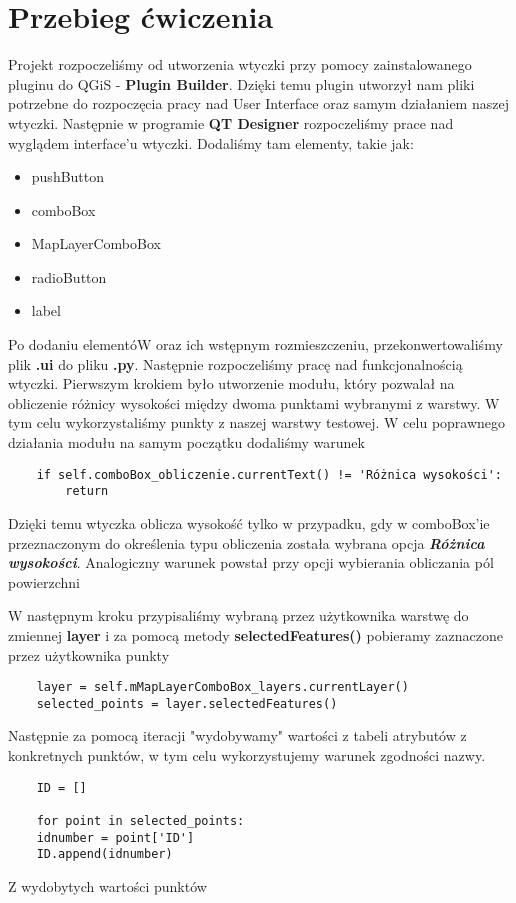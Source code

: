 \documentclass[a4paper,titleauthor]{mwart}
\begin{document}
\section{Przebieg ćwiczenia}
Projekt rozpoczeliśmy od utworzenia wtyczki przy pomocy zainstalowanego pluginu do QGiS - \textbf{Plugin Builder}. Dzięki temu plugin utworzył nam pliki potrzebne do rozpoczęcia pracy nad User Interface oraz samym działaniem naszej wtyczki. Następnie w programie \textbf{QT Designer} rozpoczeliśmy prace nad wyglądem interface'u wtyczki. Dodaliśmy tam elementy, takie jak:
\begin{itemize}
	\item pushButton
	\item comboBox
	\item MapLayerComboBox
	\item radioButton
	\item label
\end{itemize}		
Po dodaniu elementóW oraz ich wstępnym rozmieszczeniu, przekonwertowaliśmy plik \textbf{.ui} do pliku \textbf{.py}. Następnie rozpoczeliśmy pracę nad funkcjonalnością wtyczki. Pierwszym krokiem było utworzenie modułu, który pozwalał na obliczenie różnicy wysokości między dwoma punktami wybranymi z warstwy. W tym celu wykorzystaliśmy punkty z naszej warstwy testowej. W celu poprawnego działania modułu na samym początku dodaliśmy warunek 
\begin{verbatim}
	if self.comboBox_obliczenie.currentText() != 'Różnica wysokości':
		return
\end{verbatim}
Dzięki temu wtyczka oblicza wysokość tylko w przypadku, gdy w comboBox'ie przeznaczonym do określenia typu obliczenia została wybrana opcja \textbf{\textit{Różnica wysokości}}.
Analogiczny warunek powstał przy opcji wybierania obliczania pól powierzchni

W następnym kroku przypisaliśmy wybraną przez użytkownika warstwę do zmiennej \textbf{layer} i za pomocą metody \textbf{selectedFeatures()} pobieramy zaznaczone przez użytkownika punkty

\begin{verbatim}
	layer = self.mMapLayerComboBox_layers.currentLayer()
	selected_points = layer.selectedFeatures()
\end{verbatim}
Następnie za pomocą iteracji "wydobywamy" wartości z tabeli atrybutów z konkretnych punktów, w tym celu wykorzystujemy warunek zgodności nazwy.

\begin{verbatim}
	ID = []
	
	for point in selected_points:
	idnumber = point['ID']
	ID.append(idnumber)
\end{verbatim}

Z wydobytych wartości punktów 
\end{document}
